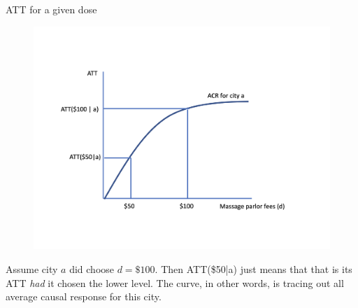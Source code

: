 \documentclass{beamer}
\begin{document}
\begin{frame}{ATT for a given dose}

\begin{figure}
\begin{center}
             \includegraphics[scale=0.3]{./lecture_includes/acrt_fig1.png}
\end{center}
\end{figure}

Assume city $a$ did choose $d=\$100$. Then ATT(\$50|a) just means that that is its ATT \emph{had} it chosen the lower level.  The curve, in other words, is tracing out all average causal response for this city.


\end{frame}
\end{document}
